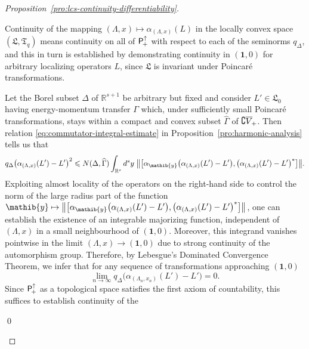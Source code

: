 \documentclass[a4paper,a4paper]{article}
\numberwithin{equation}{section}
\newcommand{\Lfrak}{\mathfrak{L}}
\newcommand{\Tfrak}{\mathfrak{T}}
\newcommand{\yib}{\mathib{y}}
\newcommand{\unit}{\mathbf{1}}
\newcommand{\Rs}{\mathbb{R}^s}
\newcommand{\Rsone}{\mathbb{R}^{s + 1}}
\newcommand{\Poin}{\mathsf{P}_{\negthinspace +}^\uparrow}
\newcommand{\fwcone}{\overline{V}_{\negthinspace +}}
\newcommand{\aLax}{\alpha_{( \Lambda , x )}}
\newcommand{\aiby}{\alpha_\mathib{y}}
\newcounter{proofitem}
\newenvironment{prooflist}{\begin{list}{(\roman{proofitem})}%
  {\usecounter{proofitem} \setlength{\topsep}{0ex}%
   \setlength{\parsep}{0.2ex} \setlength{\itemsep}{0.4ex}%
   \setlength{\leftmargin}{0em} \setlength{\itemindent}{0.5em}%
   \setlength{\listparindent}{1em}}}{\qed \end{list}}
\theoremstyle{definition}
\theoremstyle{plain}
\theoremstyle{remark}
\newcommand{\bcomm}[2]{\bigl[ #1 , #2 \bigr]}
\newcommand{\bnorm}[1]{\bigl\lVert #1 \bigr\rVert}
\newcommand{\qD}{q_\Delta}
\newcommand{\bqDx}[1]{q_\Delta \bigl( #1 \bigr)}
\begin{document}
  \begin{proof}%
         [Proposition~\ref{pro:lcs-continuity-differentiability}]
    \begin{prooflist}
    \item Continuity of the mapping $( \Lambda , x ) \mapsto \aLax ( L
      )$ in the locally convex space $( \Lfrak , \Tfrak_q )$ means
      continuity on all of $\Poin$ with respect to each of the
      seminorms $\qD$, and this in turn is established by
      demonstrating continuity in $( \unit , 0 )$ for arbitrary
      localizing operators $L$, since $\Lfrak$ is invariant under
      Poincar\'e transformations.
    
      Let the Borel subset $\Delta$ of $\Rsone$ be arbitrary but fixed
      and consider $L' \in \Lfrak_0$ having energy-momentum transfer
      $\Gamma$ which, under sufficiently small Poincar\'e
      transformations, stays within a compact and convex subset
      $\widehat{\Gamma}$ of $\complement \fwcone$. Then relation
      \eqref{eq:commutator-integral-estimate} in
      Proposition~\ref{pro:harmonic-analysis} tells us that
      \begin{equation}
        \label{eq:applied-harmonic-analysis}
        \bqDx{\aLax ( L' ) - L'}^2 \leqslant N ( \Delta ,
        \widehat{\Gamma} ) \int_{\Rs} d^s y \;
        \bnorm{\bcomm{\aiby \bigl( \aLax ( L' ) - L'
        \bigr)}{\bigl( \aLax ( L' ) - L' \bigr)^*}} \text{.}
      \end{equation}
      Exploiting almost locality of the operators on the right-hand
      side to control the norm of the large radius part of the
      function $\yib \mapsto \bnorm{\bcomm{\aiby \bigl( \aLax (
      L' ) - L' \bigr)}{\bigl( \aLax ( L' ) - L' \bigr)^*}}$, one
      can establish the existence of an integrable majorizing
      function, independent of $( \Lambda , x )$ in a small
      neighbourhood of $( \unit , 0 )$. Moreover, this integrand
      vanishes pointwise in the limit $( \Lambda , x ) \rightarrow (
      \unit , 0 )$ due to strong continuity of the automorphism group.
      Therefore, by Lebesgue's Dominated Convergence Theorem, we infer
      that for any sequence of transformations approaching $( \unit ,
      0 )$
      \begin{equation*}
        \lim_{n \rightarrow \infty} \bqDx{\alpha_{( \Lambda_n , x_n )}
        ( L' ) - L'} = 0 \text{.}
      \end{equation*}
      Since $\Poin$ as a topological space satisfies the first axiom
      of countability, this suffices to establish continuity of the

\end{prooflist}
\end{proof}
\end{document}
